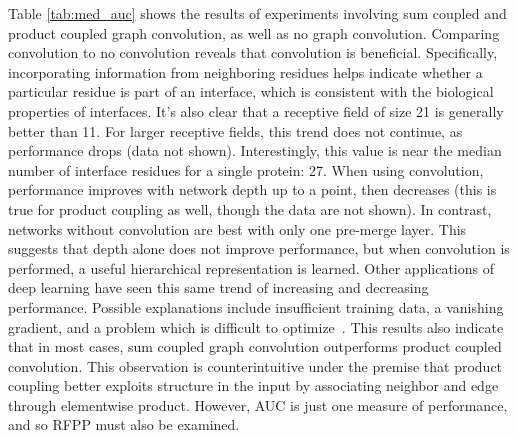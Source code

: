 Table \ref{tab:med_auc} shows the results of experiments involving sum coupled and product coupled graph convolution, as well as no graph convolution.
Comparing convolution to no convolution reveals that convolution is beneficial.
Specifically, incorporating information from neighboring residues helps indicate whether a particular residue is part of an interface, which is consistent with the biological properties of interfaces.
It's also clear that a receptive field of size 21 is generally better than 11.
For larger receptive fields, this trend does not continue, as performance drops (data not shown).
Interestingly, this value is near the median number of interface residues for a single protein: 27.
When using convolution, performance improves with network depth up to a point, then decreases (this is true for product coupling as well, though the data are not shown).
In contrast, networks without convolution are best with only one pre-merge layer.
This suggests that depth alone does not improve performance, but when convolution is performed, a useful hierarchical representation is learned.
Other applications of deep learning have seen this same trend of increasing and decreasing performance.
Possible explanations include insufficient training data, a vanishing gradient, and a problem which is difficult to optimize~\cite{he2015}.
This results also indicate that in most cases, sum coupled graph convolution outperforms product coupled convolution.
This observation is counterintuitive under the premise that product coupling better exploits structure in the input by associating neighbor and edge through elementwise product.
However, AUC is just one measure of performance, and so RFPP must also be examined.

